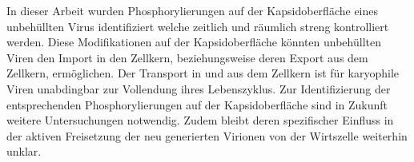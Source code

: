 \par
\medskip
In dieser Arbeit wurden Phosphorylierungen auf der Kapsidoberfläche eines unbehüllten Virus identifiziert welche zeitlich und räumlich streng kontrolliert werden. Diese Modifikationen auf der Kapsidoberfläche könnten unbehüllten Viren den Import in den Zellkern, beziehungsweise deren Export aus dem Zellkern, ermöglichen. Der Transport in und aus dem Zellkern ist für karyophile Viren unabdingbar zur Vollendung ihres Lebenszyklus. Zur Identifizierung der entsprechenden Phosphorylierungen auf der Kapsidoberfläche sind in Zukunft weitere Untersuchungen notwendig. Zudem bleibt deren spezifischer Einfluss in der aktiven Freisetzung der neu generierten Virionen von der Wirtszelle weiterhin unklar.

